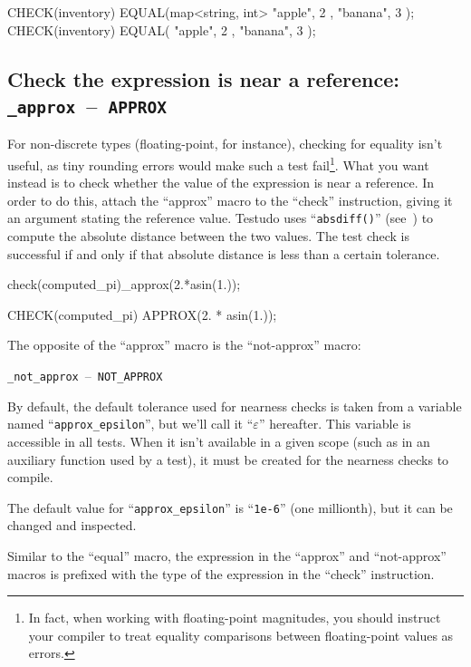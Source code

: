 \documentclass[twoside, a4paper, article]{memoir}
\newcommand*\testudocolor{\color{red!80!blue}}
\newcommand*\testudo[1]{\texttt{\testudocolor{}#1}}
\newcommand*\testudopair[2]{\testudo{#1}~--~\testudo{#2}}
\newcommand\subsectiontestudopair[3]{%
  \subsection[#1]{#1: \testudopair{#2}{#3}}}
\begin{document}
\begin{cpplisting}
CHECK(inventory)
  EQUAL(map<string, int>{ { "apple", 2 }, { "banana", 3 } });
CHECK(inventory) EQUAL({ { "apple", 2 }, { "banana", 3 } });
\end{cpplisting}


\subsectiontestudopair{Check the expression is near a reference}%
  {\_approx}{APPROX}
\label{sec:check-expression-near-reference}

For non-discrete types (floating-point, for instance), checking for equality
isn't useful, as tiny rounding errors would make such a test fail\footnote{In
  fact, when working with floating-point magnitudes, you should instruct your
  compiler to treat equality comparisons between floating-point values as
  errors.}.  What you want instead is to check whether the value of the
expression is near a reference.  In order to do this, attach the ``approx''
macro to the ``check'' instruction, giving it an argument stating the reference
value.  Testudo uses ``\texttt{absdiff()}''
(see~) to compute the absolute distance
between the two values.  The test check is successful if and only if that
absolute distance is less than a certain tolerance.

\begin{cpplisting}
check(computed_pi)_approx(2.*asin(1.));
\end{cpplisting}

\begin{cpplisting}
CHECK(computed_pi) APPROX(2. * asin(1.));
\end{cpplisting}

The opposite of the ``approx'' macro is the ``not-approx'' macro:
\begin{center}
  \testudopair{\_not\_approx}{NOT\_APPROX}
\end{center}

By default, the default tolerance used for nearness checks is taken from a
variable named ``\texttt{approx\_epsilon}'', but we'll call it
``$\varepsilon$'' hereafter.  This variable is accessible in all tests.  When
it isn't available in a given scope (such as in an auxiliary function used by a
test), it must be created for the nearness checks to compile.

The default value for ``\texttt{approx\_epsilon}'' is ``\texttt{1e-6}'' (one
millionth), but it can be changed and inspected.

Similar to the ``equal'' macro, the expression in the ``approx'' and
``not-approx'' macros is prefixed with the type of the expression in the
``check'' instruction.
\end{document}
